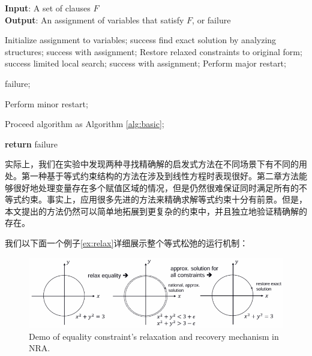 \begin{algorithm}[t]
    \caption{Relaxation of Equalities}
    \label{alg:relaxation}
    \textbf{Input}: A set of clauses $F$ \\
    \textbf{Output}: An assignment of variables that satisfy $F$, or failure
    
    \begin{algorithmic}[1] %
        \Statex \hrulefill
        \STATE Initialize assignment to variables;
        \While {\top}
            \STATE success \leftarrow find exact solution by analyzing structures;
            \RETURN success with assignment;
            \ELSE
            \STATE Restore relaxed constraints to original form;
            \STATE success \leftarrow limited local search;
            \RETURN success with assignment;
            \ELSE
            \STATE Perform major restart;
            \ENDIF
            \ENDIF
            \ENDIF

            \RETURN failure;
            \ENDIF

            \STATE Perform minor restart;
            \ENDIF
            
            \STATE Proceed algorithm as Algorithm \ref{alg:basic};
        \EndWhile

        \STATE \textbf{return} failure
    \end{algorithmic}
\end{algorithm}

实际上，我们在实验中发现两种寻找精确解的启发式方法在不同场景下有不同的用处。第一种基于等式约束结构的方法在涉及到线性方程时表现很好。第二章方法能够很好地处理变量存在多个赋值区域的情况，但是仍然很难保证同时满足所有的不等式约束。事实上，应用很多先进的方法来精确求解等式约束十分有前景\cite{CimattiGLS22, LiXZ23b}。但是，本文提出的方法仍然可以简单地拓展到更复杂的约束中，并且独立地验证精确解的存在。

我们以下面一个例子\ref{ex:relax}详细展示整个等式松弛的运行机制：
\begin{figure}[t]
    \centering
    \includegraphics[width=\columnwidth]{Img/relax.png}
     {Demo of equality constraint's relaxation and recovery mechanism in NRA.}
\label{fig:relax}
\end{figure}

